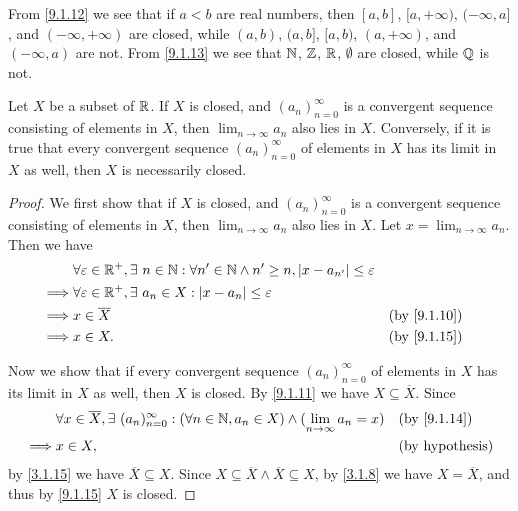 \begin{eg}\label{9.1.16}
  From \cref{9.1.12} we see that if \(a < b\) are real numbers, then \([a, b]\), \([a, +\infty)\), \((-\infty, a]\), and \((-\infty, +\infty)\) are closed, while \((a, b)\), \((a, b]\), \([a, b)\), \((a, +\infty)\), and \((-\infty, a)\) are not.
  From \cref{9.1.13} we see that \(\mathbb{N}\), \(\mathbb{Z}\), \(\mathbb{R}\), \(\emptyset\) are closed, while \(\mathbb{Q}\) is not.
\end{eg}

\begin{cor}\label{9.1.17}
  Let \(X\) be a subset of \(\mathbb{R}\).
  If \(X\) is closed, and \((a_n)_{n = 0}^\infty\) is a convergent sequence consisting of elements in \(X\), then \(\lim_{n \to \infty} a_n\) also lies in \(X\).
  Conversely, if it is true that every convergent sequence \((a_n)_{n = 0}^\infty\) of elements in \(X\) has its limit in \(X\) as well, then \(X\) is necessarily closed.
\end{cor}

\begin{proof}
  We first show that if \(X\) is closed, and \((a_n)_{n = 0}^\infty\) is a convergent sequence consisting of elements in \(X\), then \(\lim_{n \to \infty} a_n\) also lies in \(X\).
  Let \(x = \lim_{n \to \infty} a_n\).
  Then we have
  \begin{align*}
             & \forall \varepsilon \in \R^+, \exists\ n \in \N : \forall n' \in \N \land n' \geq n, \abs{x - a_{n'}} \leq \varepsilon                                \\
    \implies & \forall \varepsilon \in \R^+, \exists\ a_n \in X : \abs{x - a_n} \leq \varepsilon                                                                     \\
    \implies & x \in \overline{X}                                                                                                     &  & \text{(by \cref{9.1.10})} \\
    \implies & x \in X.                                                                                                               &  & \text{(by \cref{9.1.15})}
  \end{align*}

  Now we show that if every convergent sequence \((a_n)_{n = 0}^\infty\) of elements in \(X\) has its limit in \(X\) as well, then \(X\) is closed.
  By \cref{9.1.11} we have \(X \subseteq \overline{X}\).
  Since
  \begin{align*}
             & \forall x \in \overline{X}, \exists\ (a_n)_{n = 0}^\infty : (\forall n \in \N, a_n \in X) \land (\lim_{n \to \infty} a_n = x) &  & \text{(by \cref{9.1.14})} \\
    \implies & x \in X,                                                                                                                      &  & \text{(by hypothesis)}
  \end{align*}
  by \cref{3.1.15} we have \(\overline{X} \subseteq X\).
  Since \(X \subseteq \overline{X} \land \overline{X} \subseteq X\), by \cref{3.1.8} we have \(X = \overline{X}\), and thus by \cref{9.1.15} \(X\) is closed.
\end{proof}

